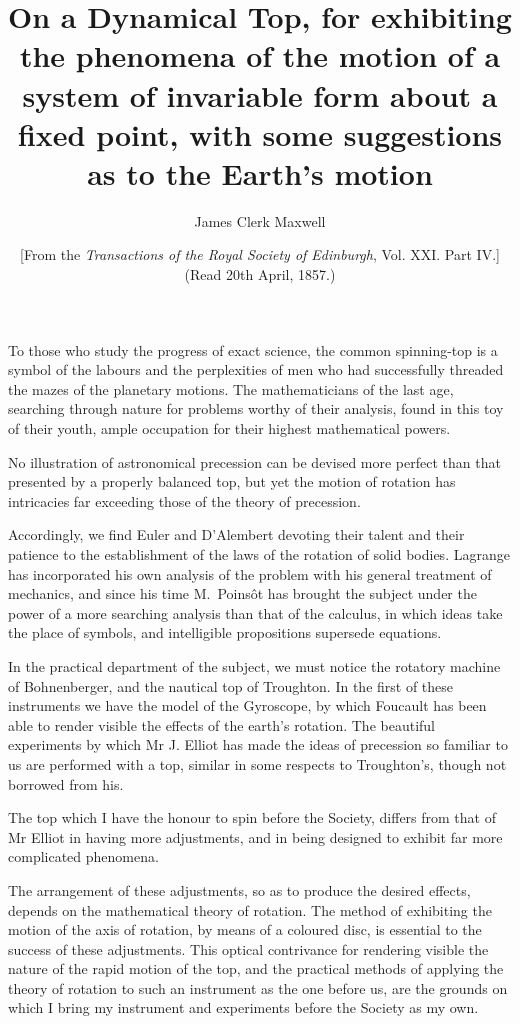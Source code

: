 \documentclass[12pt]{article}
\title{On a Dynamical Top, for exhibiting the phenomena of the motion
of a system of invariable form about a fixed point, with some
suggestions as to the Earth's motion}
\author{James Clerk Maxwell}
\date{\small [From the \emph{Transactions of the Royal Society of Edinburgh},
Vol. XXI. Part IV.] \\
(Read 20th April, 1857.)}
\begin{document}
\maketitle

To those who study the progress of exact science, the common
spinning-top is a symbol of the labours and the perplexities of men
who had successfully threaded the mazes of the planetary motions.  The
mathematicians of the last age, searching through nature for problems
worthy of their analysis, found in this toy of their youth, ample
occupation for their highest mathematical powers.

No illustration of astronomical precession can be devised more perfect
than that presented by a properly balanced top, but yet the motion of
rotation has intricacies far exceeding those of the theory of
precession.

Accordingly, we find Euler and D'Alembert devoting their talent and
their patience to the establishment of the laws of the rotation of
solid bodies.  Lagrange has incorporated his own analysis of the
problem with his general treatment of mechanics, and since his time
M.~Poins\^ot has brought the subject under the power of a more
searching analysis than that of the calculus, in which ideas take the
place of symbols, and intelligible propositions supersede equations.

In the practical department of the subject, we must notice the
rotatory machine of Bohnenberger, and the nautical top of Troughton.
In the first of these instruments we have the model of the Gyroscope,
by which Foucault has been able to render visible the effects of the
earth's rotation.  The beautiful experiments by which Mr J. Elliot has
made the ideas of precession so familiar to us are performed with a
top, similar in some respects to Troughton's, though not borrowed from
his.

The top which I have the honour to spin before the Society, differs
from that of Mr Elliot in having more adjustments, and in being
designed to exhibit far more complicated phenomena.

The arrangement of these adjustments, so as to produce the desired
effects, depends on the mathematical theory of rotation.  The method
of exhibiting the motion of the axis of rotation, by means of a
coloured disc, is essential to the success of these adjustments.  This
optical contrivance for rendering visible the nature of the rapid
motion of the top, and the practical methods of applying the theory
of rotation to such an instrument as the one before us, are the
grounds on which I bring my instrument and experiments before the
Society as my own.
\end{document}
